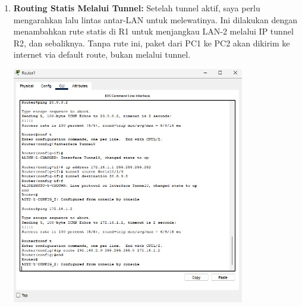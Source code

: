\begin{enumerate}
    \item \textbf{Routing Statis Melalui Tunnel:} Setelah tunnel aktif, saya perlu mengarahkan lalu lintas antar-LAN untuk melewatinya. Ini dilakukan dengan menambahkan rute statis di R1 untuk menjangkau LAN-2 melalui IP tunnel R2, dan sebaliknya. Tanpa rute ini, paket dari PC1 ke PC2 akan dikirim ke internet via default route, bukan melalui tunnel.
    \begin{center}
        \includegraphics[width=0.8\textwidth]{img5/R1RouteStatic.jpeg}
    \end{center}


\end{enumerate}
